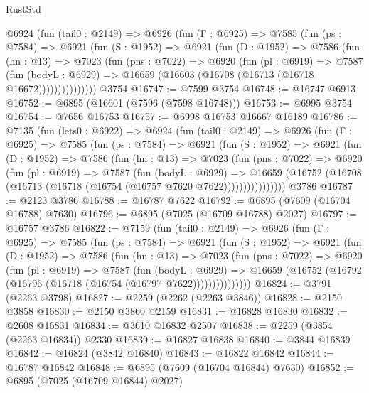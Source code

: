 \begin{lexlean}{RustStd}
\begin{coremodule}
      @6924
        (fun (tail0 : @2149) =>
        @6926
          (fun (Γ : @6925) =>
          @7585
            (fun (ps : @7584) =>
            @6921
              (fun (S : @1952) =>
              @6921
                (fun (D : @1952) =>
                @7586
                  (fun (hn : @13) =>
                  @7023
                    (fun (pns : @7022) =>
                    @6920
                      (fun (pl : @6919) =>
                      @7587
                        (fun (bodyL : @6929) =>
                        @16659 (@16603 (@16708 (@16713 (@16718 @16672)))))))))))))))
    @3754
@16747 := @7599 @3754
@16748 := @16747 @6913
@16752 := @6895 (@16601 (@7596 (@7598 @16748)))
@16753 := @6995 @3754
@16754 := @7656 @16753
@16757 := @6998 @16753 @16667 @16189
@16786 := @7135
    (fun (lets0 : @6922) =>
    @6924
      (fun (tail0 : @2149) =>
      @6926
        (fun (Γ : @6925) =>
        @7585
          (fun (ps : @7584) =>
          @6921
            (fun (S : @1952) =>
            @6921
              (fun (D : @1952) =>
              @7586
                (fun (hn : @13) =>
                @7023
                  (fun (pns : @7022) =>
                  @6920
                    (fun (pl : @6919) =>
                    @7587
                      (fun (bodyL : @6929) =>
                      @16659
                        (@16752 (@16708 (@16713 (@16718 (@16754 (@16757 @7620 @7622))))))))))))))))
    @3786
@16787 := @2123 @3786
@16788 := @16787 @7622
@16792 := @6895 (@7609 (@16704 @16788) @7630)
@16796 := @6895 (@7025 (@16709 @16788) @2027)
@16797 := @16757 @3786
@16822 := @7159
    (fun (tail0 : @2149) =>
    @6926
      (fun (Γ : @6925) =>
      @7585
        (fun (ps : @7584) =>
        @6921
          (fun (S : @1952) =>
          @6921
            (fun (D : @1952) =>
            @7586
              (fun (hn : @13) =>
              @7023
                (fun (pns : @7022) =>
                @6920
                  (fun (pl : @6919) =>
                  @7587
                    (fun (bodyL : @6929) =>
                    @16659 (@16752 (@16792 (@16796 (@16718 (@16754 (@16797 @7622)))))))))))))))
@16824 := @3791 (@2263 @3798)
@16827 := @2259 (@2262 (@2263 @3846))
@16828 := @2150 @3858
@16830 := @2150 @3860 @2159
@16831 := @16828 @16830
@16832 := @2608 @16831
@16834 := @3610 @16832 @2507
@16838 := @2259 (@3854 (@2263 @16834)) @2330
@16839 := @16827 @16838
@16840 := @3844 @16839
@16842 := @16824 (@3842 @16840)
@16843 := @16822 @16842
@16844 := @16787 @16842
@16848 := @6895 (@7609 (@16704 @16844) @7630)
@16852 := @6895 (@7025 (@16709 @16844) @2027)

\end{coremodule}
\end{lexlean}
